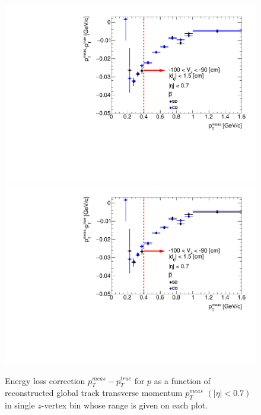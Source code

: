 \begin{figure}[H]
\caption[Energy loss correction for $p$ as a function of reconstructed global track transverse momentum $p_T^{meas}$.]{Energy loss correction $p_T^{meas}-p_T^{true}$ for $p$ as a function of reconstructed global track transverse momentum $p_T^{meas}$ $\left(|\eta|<0.7\right)$ in single $z$-vertex bin whose range is given on each plot.}\label{fig:energyLossPrimaryPGlobal}
\parbox{0.329\textwidth}{
  \includegraphics[width=\linewidth,page=23]{graphics/energyLoss/energyLoss3DGlobal_OnePrtAlso.pdf}\\
  \includegraphics[width=\linewidth,page=26]{graphics/energyLoss/energyLoss3DGlobal_OnePrtAlso.pdf}\\
}
\end{figure}
